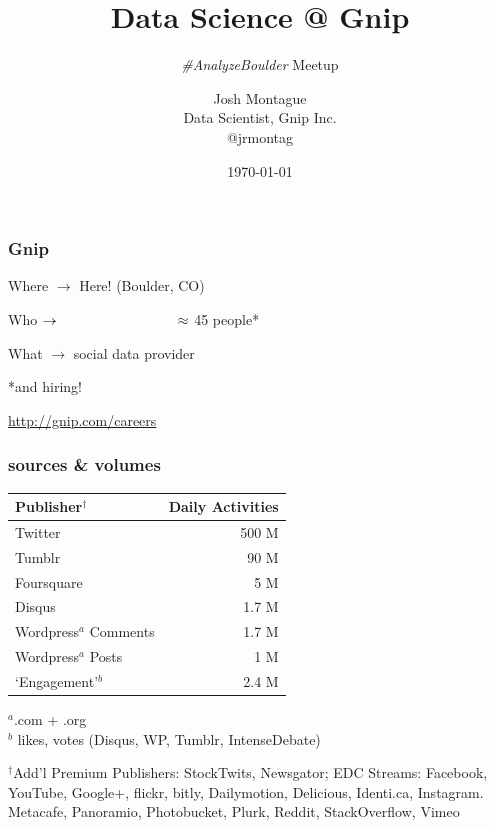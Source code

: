 \documentclass{beamer}
\title{Data Science @ Gnip }
\subtitle{\emph{\#AnalyzeBoulder} Meetup}
\author{Josh Montague\texorpdfstring{\\ Data Scientist, Gnip Inc. \\ @jrmontag}{}}
\date{\today}
\begin{document}
\begin{frame}
\titlepage
\end{frame}


\begin{frame} \frametitle{Gnip}


\vspace{0.2in}

\LARGE{Where $\to$  \hspace{0.55in} Here! (Boulder, CO) }

\vspace{0.2in}

\LARGE{Who $\to  \hspace{1.2in} \approx$ 45 people* } 

\vspace{0.2in}

\LARGE{What $\to$ \hspace{0.7in} social data provider}

\vspace{0.7in}

{\hfill \Large{*and hiring!}} 

{\hfill \normalsize\url{http://gnip.com/careers}}
\end{frame}


\begin{frame} \frametitle{sources \& volumes}

\vspace{0.1in}

\begin{table}
	\begin{tabular}{l|r}
		\hline
		{Publisher$^\dagger$}			&   	{Daily Activities} \\
		\hline 
		Twitter      					&	500 M \\
		Tumblr      					&	90 M \\
		Foursquare      					&	5 M \\
		Disqus       					&	1.7 M \\
		Wordpress$^{a}$ Comments 		&	1.7 M \\
		Wordpress$^{a}$ Posts 			&	1 M \\
		`Engagement'$^{b}$ 			&	2.4 M \\
		\hline
	\end{tabular}
\end{table}
$^a$.com + .org \\
$^b$ likes, votes (Disqus, WP, Tumblr, IntenseDebate) \\

\vspace{0.2in}

{\tiny
$^\dagger$Add'l Premium Publishers: StockTwits, Newsgator; EDC Streams: Facebook, YouTube, Google+, flickr, bitly, Dailymotion, Delicious, Identi.ca, Instagram. Metacafe, Panoramio, Photobucket, Plurk, Reddit, StackOverflow, Vimeo
}
\end{frame}
\end{document}
